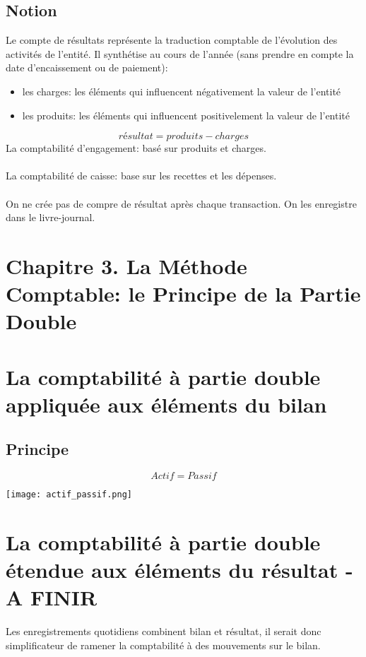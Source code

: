 \documentclass{article}
\begin{document}
\subsection{Notion}
Le compte de résultats représente la traduction comptable de l'évolution des activités de l'entité. Il synthétise au cours de l'année (sans prendre en compte la date d'encaissement ou de paiement):
\begin{itemize}
    \item les charges: les éléments qui influencent négativement la valeur de l'entité
    \item les produits: les éléments qui influencent positivelement la valeur de l'entité
\end{itemize}
$$résultat = produits - charges$$
La comptabilité d'engagement: basé sur produits et charges. \\ \\
La comptabilité de caisse: base sur les recettes et les dépenses. \\ \\
On ne crée pas de compre de résultat après chaque transaction. On les enregistre dans le livre-journal. 

\section*{Chapitre 3. La Méthode Comptable: le Principe de la Partie Double}

\section{La comptabilité à partie double appliquée aux éléments du bilan}
\subsection{Principe}
$$Actif = Passif$$

\begin{center}
\texttt{[image: actif\_passif.png]}
\end{center}

\section{La comptabilité à partie double étendue aux éléments du résultat -  A FINIR}
Les enregistrements quotidiens combinent bilan et résultat, il serait donc simplificateur de ramener la comptabilité à des mouvements sur le bilan. \\
\end{document}
